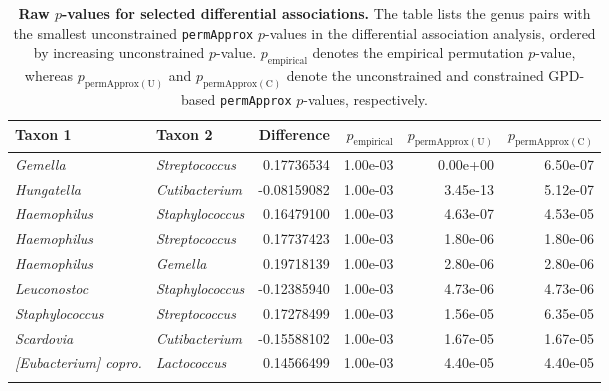 \begin{table}[!htb]
\centering
\caption{\textbf{Raw $p$-values for selected differential associations.} The table lists the genus pairs with the smallest unconstrained \texttt{permApprox} $p$-values in the differential association analysis, ordered by increasing unconstrained $p$-value. $p_{\mathrm{empirical}}$ denotes the empirical permutation $p$-value, whereas $p_{\mathrm{permApprox(U)}}$ and $p_{\mathrm{permApprox(C)}}$ denote the unconstrained and constrained GPD-based \texttt{permApprox} $p$-values, respectively.}
\label{tab:7app:network:diffassoc_pvalues}
\vspace{0.5em}
\small
\setlength{\tabcolsep}{4pt}
\begin{tabular}{llrrrr}
\toprule
Taxon 1 & Taxon 2 & Difference & $p_{\mathrm{empirical}}$ & $p_{\mathrm{permApprox(U)}}$ & $p_{\mathrm{permApprox(C)}}$ \\
\midrule
\emph{Gemella} & \emph{Streptococcus} & 0.17736534 & 1.00e-03 & 0.00e+00 & 6.50e-07 \\
\emph{Hungatella} & \emph{Cutibacterium} & -0.08159082 & 1.00e-03 & 3.45e-13 & 5.12e-07 \\
\emph{Haemophilus} & \emph{Staphylococcus} & 0.16479100 & 1.00e-03 & 4.63e-07 & 4.53e-05 \\
\emph{Haemophilus} & \emph{Streptococcus} & 0.17737423 & 1.00e-03 & 1.80e-06 & 1.80e-06 \\
\emph{Haemophilus} & \emph{Gemella} & 0.19718139 & 1.00e-03 & 2.80e-06 & 2.80e-06 \\
\emph{Leuconostoc} & \emph{Staphylococcus} & -0.12385940 & 1.00e-03 & 4.73e-06 & 4.73e-06 \\
\emph{Staphylococcus} & \emph{Streptococcus} & 0.17278499 & 1.00e-03 & 1.56e-05 & 6.35e-05 \\
\emph{Scardovia} & \emph{Cutibacterium} & -0.15588102 & 1.00e-03 & 1.67e-05 & 1.67e-05 \\
\emph{[Eubacterium] copro.} & \emph{Lactococcus} & 0.14566499 & 1.00e-03 & 4.40e-05 & 4.40e-05 \\
\bottomrule
\vspace{1em}
\end{tabular}
\end{table}

